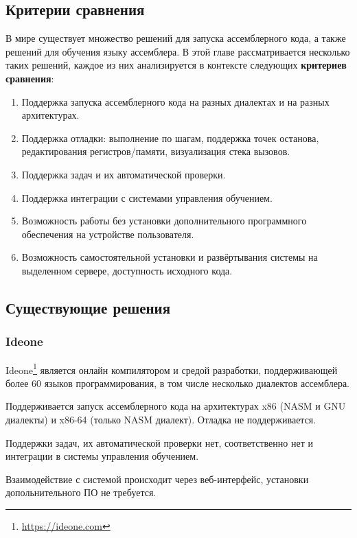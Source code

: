 \documentclass[a4paper,article,14pt]{extarticle}
\begin{document}
\subsection{Критерии сравнения}

В мире существует множество решений для запуска ассемблерного кода, а также решений для обучения языку ассемблера. В этой главе рассматривается несколько таких решений, каждое из них анализируется в контексте следующих \textbf{критериев сравнения}:

\begin{enumerate}
    \item Поддержка запуска ассемблерного кода на разных диалектах и на разных архитектурах.
    \item Поддержка отладки: выполнение по шагам, поддержка точек останова, редактирования регистров/памяти, визуализация стека вызовов.
    \item Поддержка задач и их автоматической проверки.
    \item Поддержка интеграции с системами управления обучением.
    \item Возможность работы без установки дополнительного программного обеспечения на устройстве пользователя.
    \item Возможность самостоятельной установки и развёртывания системы на выделенном сервере, доступность исходного кода.
\end{enumerate}

\subsection{Существующие решения}
\subsubsection{Ideone}

Ideone\footnote{\url{https://ideone.com}} является онлайн компилятором и средой разработки, поддерживающей более 60 языков программирования, в том числе несколько диалектов ассемблера.

Поддерживается запуск ассемблерного кода на архитектурах x86 (NASM и GNU диалекты) и x86-64 (только NASM диалект). Отладка не поддерживается.

Поддержки задач, их автоматической проверки нет, соответственно нет и интеграции в системы управления обучением.

Взаимодействие с системой происходит через веб-интерфейс, установки допольнительного ПО не требуется.
\end{document}
